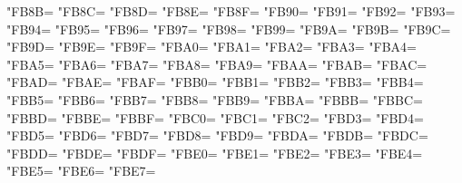 \XeTeXcharclass"FB8B=\KclassArabU
\XeTeXcharclass"FB8C=\KclassArabU
\XeTeXcharclass"FB8D=\KclassArabU
\XeTeXcharclass"FB8E=\KclassArabU
\XeTeXcharclass"FB8F=\KclassArabU
\XeTeXcharclass"FB90=\KclassArabU
\XeTeXcharclass"FB91=\KclassArabU
\XeTeXcharclass"FB92=\KclassArabU
\XeTeXcharclass"FB93=\KclassArabU
\XeTeXcharclass"FB94=\KclassArabU
\XeTeXcharclass"FB95=\KclassArabU
\XeTeXcharclass"FB96=\KclassArabU
\XeTeXcharclass"FB97=\KclassArabU
\XeTeXcharclass"FB98=\KclassArabU
\XeTeXcharclass"FB99=\KclassArabU
\XeTeXcharclass"FB9A=\KclassArabU
\XeTeXcharclass"FB9B=\KclassArabU
\XeTeXcharclass"FB9C=\KclassArabU
\XeTeXcharclass"FB9D=\KclassArabU
\XeTeXcharclass"FB9E=\KclassArabU
\XeTeXcharclass"FB9F=\KclassArabU
\XeTeXcharclass"FBA0=\KclassArabU
\XeTeXcharclass"FBA1=\KclassArabU
\XeTeXcharclass"FBA2=\KclassArabU
\XeTeXcharclass"FBA3=\KclassArabU
\XeTeXcharclass"FBA4=\KclassArabU
\XeTeXcharclass"FBA5=\KclassArabU
\XeTeXcharclass"FBA6=\KclassArabU
\XeTeXcharclass"FBA7=\KclassArabU
\XeTeXcharclass"FBA8=\KclassArabU
\XeTeXcharclass"FBA9=\KclassArabU
\XeTeXcharclass"FBAA=\KclassArabU
\XeTeXcharclass"FBAB=\KclassArabU
\XeTeXcharclass"FBAC=\KclassArabU
\XeTeXcharclass"FBAD=\KclassArabU
\XeTeXcharclass"FBAE=\KclassArabU
\XeTeXcharclass"FBAF=\KclassArabU
\XeTeXcharclass"FBB0=\KclassArabU
\XeTeXcharclass"FBB1=\KclassArabU
\XeTeXcharclass"FBB2=\KclassArabU
\XeTeXcharclass"FBB3=\KclassArabU
\XeTeXcharclass"FBB4=\KclassArabU
\XeTeXcharclass"FBB5=\KclassArabU
\XeTeXcharclass"FBB6=\KclassArabU
\XeTeXcharclass"FBB7=\KclassArabU
\XeTeXcharclass"FBB8=\KclassArabU
\XeTeXcharclass"FBB9=\KclassArabU
\XeTeXcharclass"FBBA=\KclassArabU
\XeTeXcharclass"FBBB=\KclassArabU
\XeTeXcharclass"FBBC=\KclassArabU
\XeTeXcharclass"FBBD=\KclassArabU
\XeTeXcharclass"FBBE=\KclassArabU
\XeTeXcharclass"FBBF=\KclassArabU
\XeTeXcharclass"FBC0=\KclassArabU
\XeTeXcharclass"FBC1=\KclassArabU
\XeTeXcharclass"FBC2=\KclassArabU
\XeTeXcharclass"FBD3=\KclassArabU
\XeTeXcharclass"FBD4=\KclassArabU
\XeTeXcharclass"FBD5=\KclassArabU
\XeTeXcharclass"FBD6=\KclassArabU
\XeTeXcharclass"FBD7=\KclassArabU
\XeTeXcharclass"FBD8=\KclassArabU
\XeTeXcharclass"FBD9=\KclassArabU
\XeTeXcharclass"FBDA=\KclassArabU
\XeTeXcharclass"FBDB=\KclassArabU
\XeTeXcharclass"FBDC=\KclassArabU
\XeTeXcharclass"FBDD=\KclassArabU
\XeTeXcharclass"FBDE=\KclassArabU
\XeTeXcharclass"FBDF=\KclassArabU
\XeTeXcharclass"FBE0=\KclassArabU
\XeTeXcharclass"FBE1=\KclassArabU
\XeTeXcharclass"FBE2=\KclassArabU
\XeTeXcharclass"FBE3=\KclassArabU
\XeTeXcharclass"FBE4=\KclassArabU
\XeTeXcharclass"FBE5=\KclassArabU
\XeTeXcharclass"FBE6=\KclassArabU
\XeTeXcharclass"FBE7=\KclassArabU
